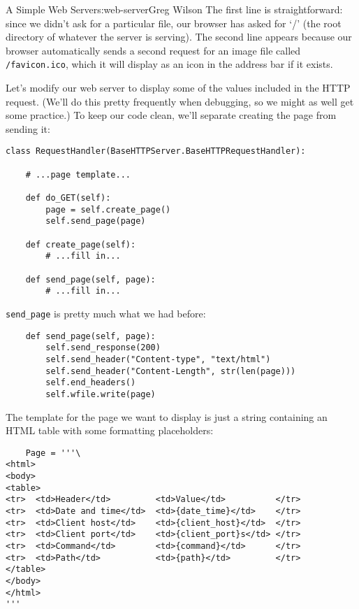 \begin{aosachapter}{A Simple Web Server}{s:web-server}{Greg Wilson}
The first line is straightforward: since we didn't ask for a particular
file, our browser has asked for `/' (the root directory of whatever the
server is serving). The second line appears because our browser
automatically sends a second request for an image file called
\texttt{/favicon.ico}, which it will display as an icon in the address
bar if it exists.

\label{displaying-values}

Let's modify our web server to display some of the values included in
the HTTP request. (We'll do this pretty frequently when debugging, so we
might as well get some practice.) To keep our code clean, we'll separate
creating the page from sending it:

\begin{verbatim}
class RequestHandler(BaseHTTPServer.BaseHTTPRequestHandler):

    # ...page template...

    def do_GET(self):
        page = self.create_page()
        self.send_page(page)

    def create_page(self):
        # ...fill in...

    def send_page(self, page):
        # ...fill in...
\end{verbatim}

\texttt{send\_page} is pretty much what we had before:

\begin{verbatim}
    def send_page(self, page):
        self.send_response(200)
        self.send_header("Content-type", "text/html")
        self.send_header("Content-Length", str(len(page)))
        self.end_headers()
        self.wfile.write(page)
\end{verbatim}

The template for the page we want to display is just a string containing
an HTML table with some formatting placeholders:

\begin{verbatim}
    Page = '''\
<html>
<body>
<table>
<tr>  <td>Header</td>         <td>Value</td>          </tr>
<tr>  <td>Date and time</td>  <td>{date_time}</td>    </tr>
<tr>  <td>Client host</td>    <td>{client_host}</td>  </tr>
<tr>  <td>Client port</td>    <td>{client_port}s</td> </tr>
<tr>  <td>Command</td>        <td>{command}</td>      </tr>
<tr>  <td>Path</td>           <td>{path}</td>         </tr>
</table>
</body>
</html>
'''
\end{verbatim}


\end{aosachapter}
